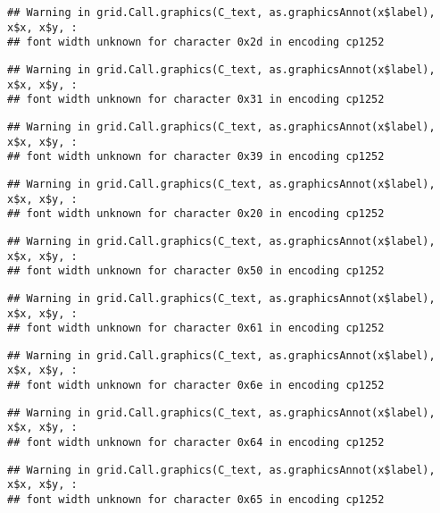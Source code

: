 \documentclass[
]{article}
\begin{document}
\begin{verbatim}
## Warning in grid.Call.graphics(C_text, as.graphicsAnnot(x$label), x$x, x$y, :
## font width unknown for character 0x2d in encoding cp1252
\end{verbatim}

\begin{verbatim}
## Warning in grid.Call.graphics(C_text, as.graphicsAnnot(x$label), x$x, x$y, :
## font width unknown for character 0x31 in encoding cp1252
\end{verbatim}

\begin{verbatim}
## Warning in grid.Call.graphics(C_text, as.graphicsAnnot(x$label), x$x, x$y, :
## font width unknown for character 0x39 in encoding cp1252
\end{verbatim}

\begin{verbatim}
## Warning in grid.Call.graphics(C_text, as.graphicsAnnot(x$label), x$x, x$y, :
## font width unknown for character 0x20 in encoding cp1252
\end{verbatim}

\begin{verbatim}
## Warning in grid.Call.graphics(C_text, as.graphicsAnnot(x$label), x$x, x$y, :
## font width unknown for character 0x50 in encoding cp1252
\end{verbatim}

\begin{verbatim}
## Warning in grid.Call.graphics(C_text, as.graphicsAnnot(x$label), x$x, x$y, :
## font width unknown for character 0x61 in encoding cp1252
\end{verbatim}

\begin{verbatim}
## Warning in grid.Call.graphics(C_text, as.graphicsAnnot(x$label), x$x, x$y, :
## font width unknown for character 0x6e in encoding cp1252
\end{verbatim}

\begin{verbatim}
## Warning in grid.Call.graphics(C_text, as.graphicsAnnot(x$label), x$x, x$y, :
## font width unknown for character 0x64 in encoding cp1252
\end{verbatim}

\begin{verbatim}
## Warning in grid.Call.graphics(C_text, as.graphicsAnnot(x$label), x$x, x$y, :
## font width unknown for character 0x65 in encoding cp1252
\end{verbatim}
\end{document}
